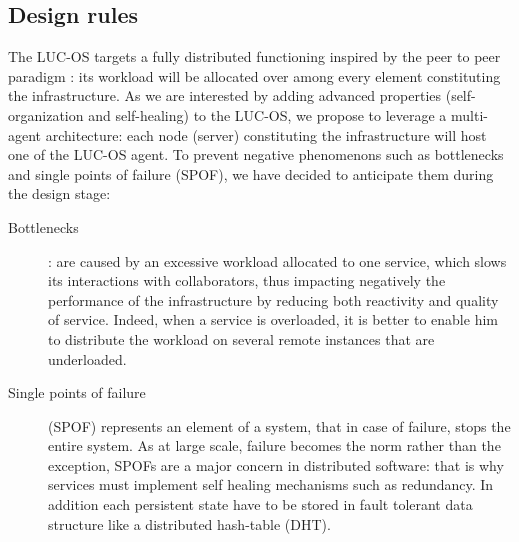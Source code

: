 \subsection{Design rules}

The LUC-OS targets a fully distributed functioning inspired by the peer to peer
paradigm : its workload will be allocated over among every element constituting
the infrastructure. As we are interested by adding advanced properties 
(self-organization and self-healing) to the LUC-OS, we propose to leverage a 
multi-agent architecture: each node (server) constituting the infrastructure 
will host one of the LUC-OS agent. To prevent negative phenomenons such as
bottlenecks and single points of failure (SPOF), we have decided to anticipate
them during the design stage:

\begin{description}

  \item [Bottlenecks] : are caused by an excessive workload allocated to one 
  service, which slows its interactions with collaborators, thus impacting
  negatively the performance of the infrastructure by reducing both reactivity 
  and quality of service. Indeed, when a service is overloaded, it is better to 
  enable him to distribute the workload on several remote instances that are
  underloaded.

  \item [Single points of failure] (SPOF) represents an element of a system, 
  that in case of failure, stops the entire system. As at large scale, failure 
  becomes the norm rather than the exception, SPOFs are a major concern in
  distributed software: that is why services must implement self healing 
  mechanisms such as redundancy. In addition each persistent state have to be 
  stored in fault tolerant data structure like a distributed hash-table (DHT).

\end{description}

